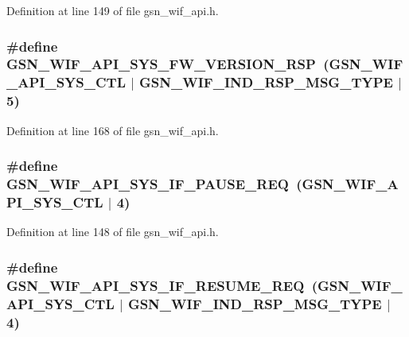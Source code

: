Definition at line 149 of file gsn\_\-wif\_\-api.h.

\hypertarget{a00606_ae890eabe1132a01ac9aa6ef5d5ee105e}{
\subsubsection[{GSN\_\-WIF\_\-API\_\-SYS\_\-FW\_\-VERSION\_\-RSP}]{\setlength{\rightskip}{0pt plus 5cm}\#define GSN\_\-WIF\_\-API\_\-SYS\_\-FW\_\-VERSION\_\-RSP~(GSN\_\-WIF\_\-API\_\-SYS\_\-CTL $|$ GSN\_\-WIF\_\-IND\_\-RSP\_\-MSG\_\-TYPE $|$ 5)}}
\label{a00606_ae890eabe1132a01ac9aa6ef5d5ee105e}


Definition at line 168 of file gsn\_\-wif\_\-api.h.

\hypertarget{a00606_a7a90408cd351147200b5824ceaf21510}{
\subsubsection[{GSN\_\-WIF\_\-API\_\-SYS\_\-IF\_\-PAUSE\_\-REQ}]{\setlength{\rightskip}{0pt plus 5cm}\#define GSN\_\-WIF\_\-API\_\-SYS\_\-IF\_\-PAUSE\_\-REQ~(GSN\_\-WIF\_\-API\_\-SYS\_\-CTL $|$ 4)}}
\label{a00606_a7a90408cd351147200b5824ceaf21510}


Definition at line 148 of file gsn\_\-wif\_\-api.h.

\hypertarget{a00606_aba7166569706b2885be26e10411fbdf5}{
\subsubsection[{GSN\_\-WIF\_\-API\_\-SYS\_\-IF\_\-RESUME\_\-REQ}]{\setlength{\rightskip}{0pt plus 5cm}\#define GSN\_\-WIF\_\-API\_\-SYS\_\-IF\_\-RESUME\_\-REQ~(GSN\_\-WIF\_\-API\_\-SYS\_\-CTL $|$ GSN\_\-WIF\_\-IND\_\-RSP\_\-MSG\_\-TYPE $|$ 4)}}
\label{a00606_aba7166569706b2885be26e10411fbdf5}


